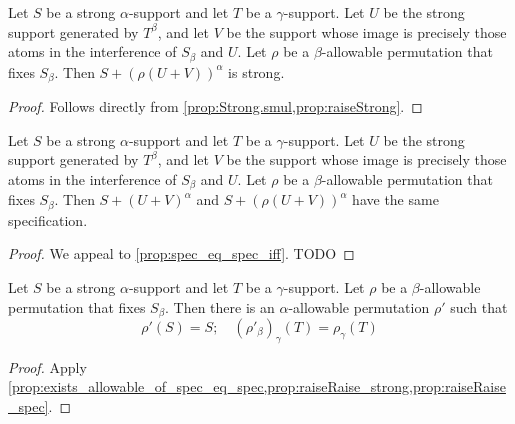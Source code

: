 \begin{proposition}
  \label{prop:raiseRaise_strong}
  Let \( S \) be a strong \( \alpha \)-support and let \( T \) be a \( \gamma \)-support.
  Let \( U \) be the strong support generated by \( T^\beta \), and let \( V \) be the support whose image is precisely those atoms in the interference of \( S_\beta \) and \( U \).
  Let \( \rho \) be a \( \beta \)-allowable permutation that fixes \( S_\beta \).
  Then \( S + (\rho(U + V))^\alpha \) is strong.
\end{proposition}
\begin{proof}
  Follows directly from \cref{prop:Strong.smul,prop:raiseStrong}.
\end{proof}
\begin{proposition}
  \label{prop:raiseRaise_spec}
  Let \( S \) be a strong \( \alpha \)-support and let \( T \) be a \( \gamma \)-support.
  Let \( U \) be the strong support generated by \( T^\beta \), and let \( V \) be the support whose image is precisely those atoms in the interference of \( S_\beta \) and \( U \).
  Let \( \rho \) be a \( \beta \)-allowable permutation that fixes \( S_\beta \).
  Then \( S + (U + V)^\alpha \) and \( S + (\rho(U + V))^\alpha \) have the same specification.
\end{proposition}
\begin{proof}
  We appeal to \cref{prop:spec_eq_spec_iff}.
  TODO
\end{proof}
\begin{proposition}
  \label{prop:exists_allowable_of_fixes}
  Let \( S \) be a strong \( \alpha \)-support and let \( T \) be a \( \gamma \)-support.
  Let \( \rho \) be a \( \beta \)-allowable permutation that fixes \( S_\beta \).
  Then there is an \( \alpha \)-allowable permutation \( \rho' \) such that
  \[ \rho'(S) = S;\quad (\rho'_\beta)_\gamma(T) = \rho_\gamma(T) \]
\end{proposition}
\begin{proof}
  Apply \cref{prop:exists_allowable_of_spec_eq_spec,prop:raiseRaise_strong,prop:raiseRaise_spec}.
\end{proof}

